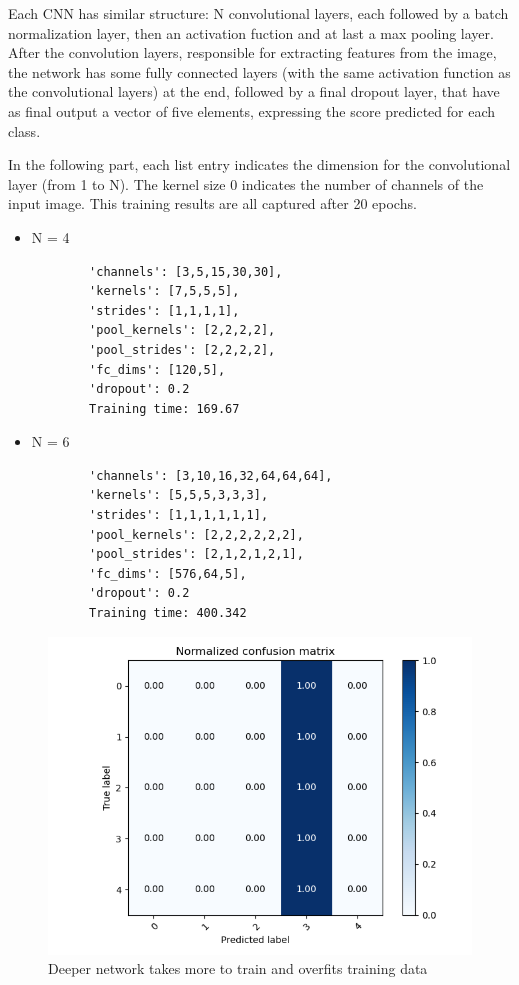 \documentclass[12pt,a4paper,oneside]{article}
\begin{document}
Each CNN has similar structure: N convolutional layers, each followed by a batch
normalization layer, then an activation fuction and at last a max pooling layer.
After the convolution layers, responsible for extracting features from the
image, the network has some fully connected layers (with the same activation
function as the convolutional layers) at the end, followed by a final dropout layer,
that have as final output a vector of five elements, expressing the score
predicted for each class. 

In the following part, each list entry indicates the dimension for the convolutional
layer (from 1 to N). The kernel size 0 indicates the number of channels of the
input image. This training results are all captured after 20 epochs.

\begin{itemize}
    \item N = 4
    \begin{verbatim}
        'channels': [3,5,15,30,30],
        'kernels': [7,5,5,5],
        'strides': [1,1,1,1],
        'pool_kernels': [2,2,2,2],
        'pool_strides': [2,2,2,2],
        'fc_dims': [120,5],
        'dropout': 0.2
        Training time: 169.67
    \end{verbatim}
    \item N = 6 
    \begin{verbatim}
        'channels': [3,10,16,32,64,64,64],
        'kernels': [5,5,5,3,3,3],
        'strides': [1,1,1,1,1,1],
        'pool_kernels': [2,2,2,2,2,2],
        'pool_strides': [2,1,2,1,2,1],
        'fc_dims': [576,64,5],
        'dropout': 0.2
        Training time: 400.342
    \end{verbatim}
\end{itemize}

\begin{figure}[H]
    \includegraphics{figures/deeper.png}
    \caption{Deeper network takes more to train and overfits training data}
\end{figure}
\end{document}
